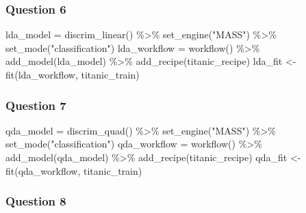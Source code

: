 \documentclass[
]{article}
\newenvironment{Shaded}{\begin{snugshade}}{\end{snugshade}}
\newcommand{\FunctionTok}[1]{\textcolor[rgb]{0.00,0.00,0.00}{#1}}
\newcommand{\NormalTok}[1]{#1}
\newcommand{\OtherTok}[1]{\textcolor[rgb]{0.56,0.35,0.01}{#1}}
\newcommand{\SpecialCharTok}[1]{\textcolor[rgb]{0.00,0.00,0.00}{#1}}
\newcommand{\StringTok}[1]{\textcolor[rgb]{0.31,0.60,0.02}{#1}}
\begin{document}
\hypertarget{question-6}{%
\subsubsection{Question 6}\label{question-6}}

\begin{Shaded}
\begin{Highlighting}[]
\NormalTok{lda\_model }\OtherTok{=} \FunctionTok{discrim\_linear}\NormalTok{() }\SpecialCharTok{\%\textgreater{}\%}
  \FunctionTok{set\_engine}\NormalTok{(}\StringTok{"MASS"}\NormalTok{) }\SpecialCharTok{\%\textgreater{}\%}
  \FunctionTok{set\_mode}\NormalTok{(}\StringTok{"classification"}\NormalTok{)}
\NormalTok{lda\_workflow }\OtherTok{=} \FunctionTok{workflow}\NormalTok{() }\SpecialCharTok{\%\textgreater{}\%}
  \FunctionTok{add\_model}\NormalTok{(lda\_model) }\SpecialCharTok{\%\textgreater{}\%}
  \FunctionTok{add\_recipe}\NormalTok{(titanic\_recipe)}
\NormalTok{lda\_fit }\OtherTok{\textless{}{-}} \FunctionTok{fit}\NormalTok{(lda\_workflow, titanic\_train)}
\end{Highlighting}
\end{Shaded}

\hypertarget{question-7}{%
\subsubsection{Question 7}\label{question-7}}

\begin{Shaded}
\begin{Highlighting}[]
\NormalTok{qda\_model }\OtherTok{=} \FunctionTok{discrim\_quad}\NormalTok{() }\SpecialCharTok{\%\textgreater{}\%}
  \FunctionTok{set\_engine}\NormalTok{(}\StringTok{"MASS"}\NormalTok{) }\SpecialCharTok{\%\textgreater{}\%}
  \FunctionTok{set\_mode}\NormalTok{(}\StringTok{"classification"}\NormalTok{)}
\NormalTok{qda\_workflow }\OtherTok{=} \FunctionTok{workflow}\NormalTok{() }\SpecialCharTok{\%\textgreater{}\%}
  \FunctionTok{add\_model}\NormalTok{(qda\_model) }\SpecialCharTok{\%\textgreater{}\%}
  \FunctionTok{add\_recipe}\NormalTok{(titanic\_recipe)}
\NormalTok{qda\_fit }\OtherTok{\textless{}{-}} \FunctionTok{fit}\NormalTok{(qda\_workflow, titanic\_train)}
\end{Highlighting}
\end{Shaded}

\hypertarget{question-8}{%
\subsubsection{Question 8}\label{question-8}}
\end{document}
